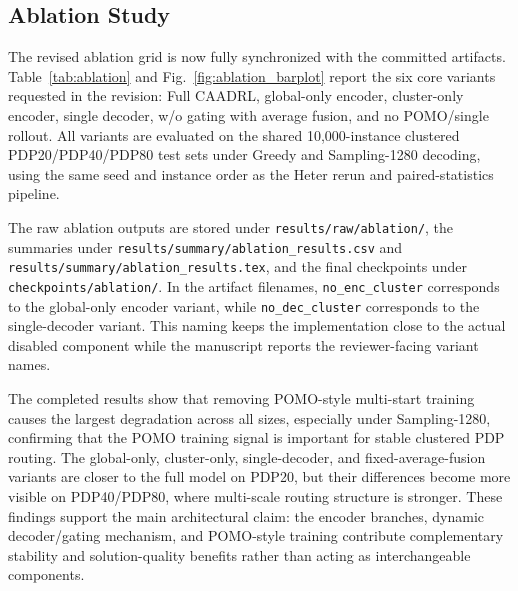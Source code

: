 \documentclass[pdflatex,sn-basic,Numbered]{sn-jnl}
\begin{document}
\subsection{Ablation Study}
The revised ablation grid is now fully synchronized with the committed artifacts. Table~\ref{tab:ablation} and Fig.~\ref{fig:ablation_barplot} report the six core variants requested in the revision: Full CAADRL, global-only encoder, cluster-only encoder, single decoder, w/o gating with average fusion, and no POMO/single rollout. All variants are evaluated on the shared 10,000-instance clustered PDP20/PDP40/PDP80 test sets under Greedy and Sampling-1280 decoding, using the same seed and instance order as the Heter rerun and paired-statistics pipeline.

The raw ablation outputs are stored under \texttt{results/raw/ablation/}, the summaries under \texttt{results/summary/ablation\_results.csv} and \texttt{results/summary/ablation\_results.tex}, and the final checkpoints under \texttt{checkpoints/ablation/}. In the artifact filenames, \texttt{no\_enc\_cluster} corresponds to the global-only encoder variant, while \texttt{no\_dec\_cluster} corresponds to the single-decoder variant. This naming keeps the implementation close to the actual disabled component while the manuscript reports the reviewer-facing variant names.

The completed results show that removing POMO-style multi-start training causes the largest degradation across all sizes, especially under Sampling-1280, confirming that the POMO training signal is important for stable clustered PDP routing. The global-only, cluster-only, single-decoder, and fixed-average-fusion variants are closer to the full model on PDP20, but their differences become more visible on PDP40/PDP80, where multi-scale routing structure is stronger. These findings support the main architectural claim: the encoder branches, dynamic decoder/gating mechanism, and POMO-style training contribute complementary stability and solution-quality benefits rather than acting as interchangeable components.
\end{document}
